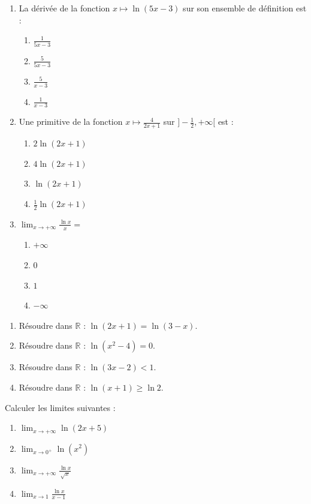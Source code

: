 \documentclass[11pt]{article}
\begin{document}
\begin{exercice}
\begin{enumerate}
    \item La dérivée de la fonction $x \mapsto \ln(5x-3)$ sur son ensemble de définition est :
    \begin{enumerate}
        \item $\frac{1}{5x-3}$
        \item $\frac{5}{5x-3}$
        \item $\frac{5}{x-3}$
        \item $\frac{1}{x-3}$
    \end{enumerate}
    \item Une primitive de la fonction $x \mapsto \frac{4}{2x+1}$ sur $]-\frac{1}{2}, +\infty[$ est :
    \begin{enumerate}
        \item $2\ln(2x+1)$
        \item $4\ln(2x+1)$
        \item $\ln(2x+1)$
        \item $\frac{1}{2}\ln(2x+1)$
    \end{enumerate}
    \item $\displaystyle\lim_{x \to +\infty} \frac{\ln x}{x} = $
    \begin{enumerate}
        \item $+\infty$
        \item $0$
        \item $1$
        \item $-\infty$
    \end{enumerate}
\end{enumerate}
\end{exercice}

\begin{exercice}
\begin{enumerate}
    \item Résoudre dans $\mathbb{R}$ : $\ln(2x+1) = \ln(3-x)$.
    \item Résoudre dans $\mathbb{R}$ : $\ln(x^2 - 4) = 0$.
    \item Résoudre dans $\mathbb{R}$ : $\ln(3x-2) < 1$.
    \item Résoudre dans $\mathbb{R}$ : $\ln(x+1) \ge \ln 2$.
\end{enumerate}
\end{exercice}

\begin{exercice}
Calculer les limites suivantes :
\begin{enumerate}
    \item $\displaystyle\lim_{x \to +\infty} \ln(2x+5)$
    \item $\displaystyle\lim_{x \to 0^+} \ln(x^2)$
    \item $\displaystyle\lim_{x \to +\infty} \frac{\ln x}{\sqrt{x}}$
    \item $\displaystyle\lim_{x \to 1} \frac{\ln x}{x-1}$
\end{enumerate}
\end{exercice}
\end{document}
